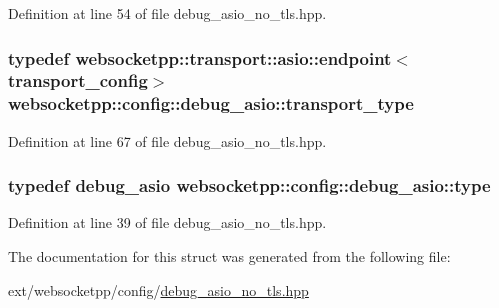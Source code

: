 Definition at line 54 of file debug\+\_\+asio\+\_\+no\+\_\+tls.\+hpp.

\hypertarget{structwebsocketpp_1_1config_1_1debug__asio_a336ec3195f646c6b3c5d344beb9dc5b7}{}
\subsubsection[{transport\+\_\+type}]{\setlength{\rightskip}{0pt plus 5cm}typedef {\bf websocketpp\+::transport\+::asio\+::endpoint}$<${\bf transport\+\_\+config}$>$ {\bf websocketpp\+::config\+::debug\+\_\+asio\+::transport\+\_\+type}}\label{structwebsocketpp_1_1config_1_1debug__asio_a336ec3195f646c6b3c5d344beb9dc5b7}


Definition at line 67 of file debug\+\_\+asio\+\_\+no\+\_\+tls.\+hpp.

\hypertarget{structwebsocketpp_1_1config_1_1debug__asio_a10a7037cdb25a39e64780105e83147d0}{}
\subsubsection[{type}]{\setlength{\rightskip}{0pt plus 5cm}typedef {\bf debug\+\_\+asio} {\bf websocketpp\+::config\+::debug\+\_\+asio\+::type}}\label{structwebsocketpp_1_1config_1_1debug__asio_a10a7037cdb25a39e64780105e83147d0}


Definition at line 39 of file debug\+\_\+asio\+\_\+no\+\_\+tls.\+hpp.



The documentation for this struct was generated from the following file\+:\begin{DoxyCompactItemize}
\item 
ext/websocketpp/config/\hyperlink{debug__asio__no__tls_8hpp}{debug\+\_\+asio\+\_\+no\+\_\+tls.\+hpp}\end{DoxyCompactItemize}

